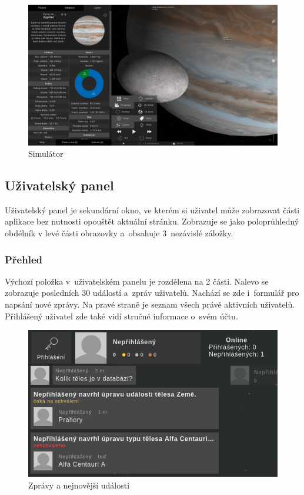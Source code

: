 \documentclass[a4paper,12pt]{article}
\begin{document}
\begin{figure}[H]
\begin{center}
\includegraphics[width=450pt]{Images/Simulator.png}
\caption{Simulátor}
\end{center}
\end{figure}

\vspace*{-1cm}
\subsection{Uživatelský panel}

Uživatelský panel je sekundární okno, ve kterém si uživatel může zobrazovat části aplikace bez nutnosti opouštět aktuální stránku. Zobrazuje se jako poloprůhledný obdélník v levé části obrazovky a~obsahuje 3~nezávislé záložky.

\subsubsection{Přehled}

Výchozí položka v~uživatelském panelu je rozdělena na 2 části. Nalevo se zobrazuje posledních 30 událostí a~zpráv uživatelů. Nachází se zde i~formulář pro napsání nové zprávy. Na pravé straně je seznam všech právě aktivních uživatelů. Přihlášený uživatel zde také vidí stručné informace o~svém účtu.

\begin{figure}[H]
\begin{center}
\includegraphics[width=400pt]{Images/Overview.png}
\caption{Zprávy a nejnovější události}
\end{center}
\end{figure}
\end{document}
